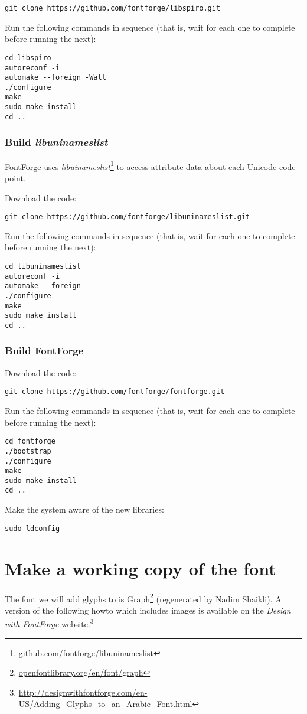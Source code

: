 \verb|git clone https://github.com/fontforge/libspiro.git|

Run the following commands in sequence (that is, wait for each one to complete before running the next):
\begin{verbatim}
cd libspiro
autoreconf -i
automake --foreign -Wall
./configure
make
sudo make install
cd ..
\end{verbatim}

\subsubsection{Build \textit{libuninameslist}}

FontForge uses \textit{libuinameslist}\footnote{\url{github.com/fontforge/libuninameslist}} to access attribute data about each Unicode code point.

Download the code:

\verb|git clone https://github.com/fontforge/libuninameslist.git|

Run the following commands in sequence (that is, wait for each one to complete before running the next):
\begin{verbatim}
cd libuninameslist
autoreconf -i
automake --foreign
./configure
make
sudo make install
cd ..
\end{verbatim}

\subsubsection{Build FontForge}

Download the code:

\verb|git clone https://github.com/fontforge/fontforge.git|

Run the following commands in sequence (that is, wait for each one to complete before running the next):
\begin{verbatim}
cd fontforge
./bootstrap
./configure
make
sudo make install
cd ..
\end{verbatim}

Make the system aware of the new libraries:

\verb|sudo ldconfig|


\section{Make a working copy of the font}

The font we will add glyphs to is Graph\footnote{\url{openfontlibrary.org/en/font/graph}} (regenerated by Nadim Shaikli).  A version of the following howto which includes images is available on the \textit{Design with FontForge} website.\footnote{\url{http://designwithfontforge.com/en-US/Adding_Glyphs_to_an_Arabic_Font.html}}

